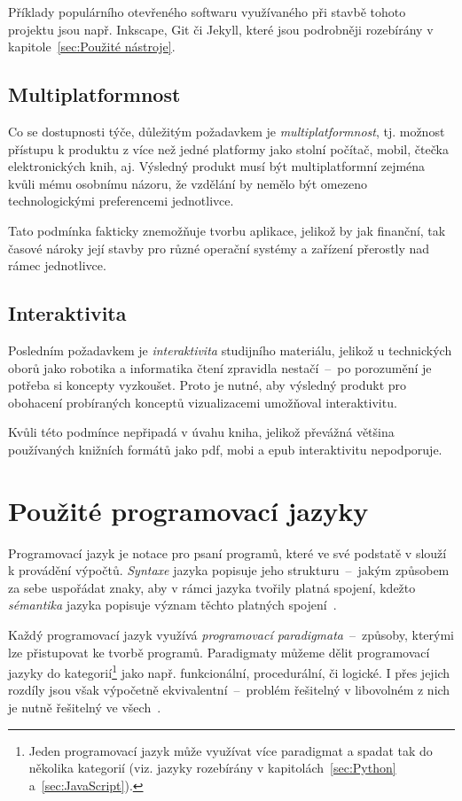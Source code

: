 \documentclass[a4paper, 12pt, twoside]{article}
\begin{document}
  Příklady populárního otevřeného softwaru využívaného při stavbě tohoto projektu jsou např. Inkscape, Git či Jekyll, které jsou podrobněji rozebírány v kapitole~\ref{sec:Použité nástroje}.


  \subsection{Multiplatformnost}
  Co se dostupnosti týče, důležitým požadavkem je \emph{multiplatformnost}, tj. možnost přístupu k produktu z více než jedné platformy jako stolní počítač, mobil, čtečka elektronických knih, aj. Výsledný produkt musí být multiplatformní zejména kvůli mému osobnímu názoru, že vzdělání by nemělo být omezeno technologickými preferencemi jednotlivce.

  Tato podmínka fakticky znemožňuje tvorbu aplikace, jelikož by jak finanční, tak časové nároky její stavby pro různé operační systémy a zařízení přerostly nad rámec jednotlivce.


  \subsection{Interaktivita}
  Posledním požadavkem je \emph{interaktivita} studijního materiálu, jelikož u technických oborů jako robotika a informatika čtení zpravidla nestačí~--~po porozumění je potřeba si koncepty vyzkoušet. Proto je nutné, aby výsledný  produkt pro obohacení probíraných konceptů vizualizacemi umožňoval interaktivitu.

  Kvůli této podmínce nepřipadá v úvahu kniha, jelikož převážná většina používaných knižních formátů jako \gls{pdf}, \gls{mobi} a \gls{epub} interaktivitu nepodporuje.


  \section{Použité programovací jazyky} \label{sec:Použité programovací jazyky}
  Programovací jazyk je notace pro psaní programů, které ve své podstatě v slouží k provádění výpočtů. \emph{Syntaxe} jazyka popisuje jeho strukturu~--~jakým způsobem za sebe uspořádat znaky, aby v rámci jazyka tvořily platná spojení, kdežto \emph{sémantika} jazyka popisuje význam těchto platných spojení~\cite{intro-to-programming-languages}.

  Každý programovací jazyk využívá \emph{programovací paradigmata}~--~způsoby, kterými lze přistupovat ke tvorbě programů. Paradigmaty můžeme dělit programovací jazyky do kategorií\footnote{Jeden programovací jazyk může využívat více paradigmat a spadat tak do několika kategorií (viz. jazyky rozebírány v kapitolách~\ref{sec:Python} a~\ref{sec:JavaScript}).} jako např. funkcionální, procedurální, či logické. I přes jejich rozdíly jsou však výpočetně ekvivalentní~--~problém řešitelný v libovolném z nich je nutně řešitelný ve všech~\cite{intro-to-programming-languages}.
\end{document}

